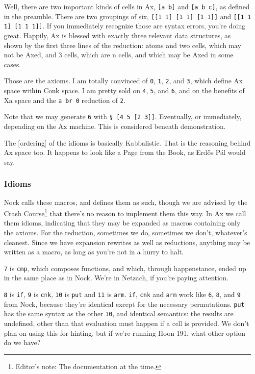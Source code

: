 \documentclass[twoside]{article}
\begin{document}
Well, there are two important kinds of cells in Ax, \texttt{[a b]} and \texttt{[a b c]}, as defined in the preamble. There are two groupings of six, \texttt{[[1 1] [1 1] [1 1]]} and \texttt{[[1 1 1] [1 1 1]]}. If you immediately recognize those are syntax errors, you're doing great. Happily, Ax is blessed with exactly three relevant data structures, as shown by the first three lines of the reduction: atoms and two cells, which may not be Axed, and 3 cells, which are n cells, and which may be Axed in some cases. 

Those are the axioms. I am totally convinced of \texttt{0}, \texttt{1}, \texttt{2}, and \texttt{3}, which define Ax space within Conk space. I am pretty sold on \texttt{4}, \texttt{5}, and \texttt{6}, and on the benefits of Xa space and the \texttt{a br 0} reduction of \texttt{2}.

Note that we may generate \texttt{6} with \texttt{§ [4 5 [2 3]]}. Eventually, or immediately, depending on the Ax machine. This is considered beneath demonstration.

The [ordering] of the idioms is basically Kabbalistic. That is the reasoning behind Ax space too. It happens to look like a Page from the Book, as Erdős Pál would say.

\subsubsection{Idioms}

Nock calls these macros, and defines them as such, though we are advised by the Crash Course\footnote{Editor's note:  The documentation at the time.} that there's no reason to implement them this way. In Ax we call them idioms, indicating that they may be expanded as macros containing only the axioms. For the reduction, sometimes we do, sometimes we don't, whatever's cleanest. Since we have expansion rewrites as well as reductions, anything may be written as a macro, as long as you're not in a hurry to halt. 

\texttt{7} is \texttt{cmp}, which composes functions, and which, through happenstance, ended up in the same place as in Nock. We're in Netzach, if you're paying attention.

\texttt{8} is \texttt{if}, \texttt{9} is \texttt{cnk}, \texttt{10} is \texttt{put} and \texttt{11} is \texttt{arm}. \texttt{if}, \texttt{cnk} and \texttt{arm} work like \texttt{6}, \texttt{8}, and \texttt{9} from Nock, because they're identical except for the necessary permutations. \texttt{put} has the same syntax as the other \texttt{10}, and identical semantics: the results are undefined, other than that evaluation must happen if a cell is provided. We don't plan on using this for hinting, but if we're running Hoon 191, what other option do we have? 
\end{document}
